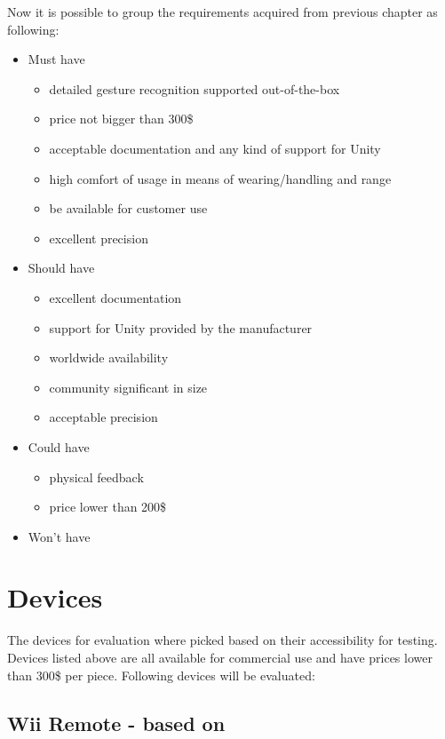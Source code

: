 Now it is possible to group the requirements acquired from previous chapter as following:
\begin{itemize}
\item Must have
\begin{itemize}
\item detailed gesture recognition supported out-of-the-box
\item price not bigger than 300\$
\item acceptable documentation and any kind of support for Unity
\item high comfort of usage in means of wearing/handling and range
\item be available for customer use
\item excellent precision
\end{itemize}
\item Should have
\begin{itemize}
\item excellent documentation
\item support for Unity provided by the manufacturer
\item worldwide availability 
\item community significant in size
\item acceptable precision
\end{itemize}
\item Could have
\begin{itemize}
\item physical feedback
\item price lower than 200\$
\end{itemize}
\item Won't have
\end{itemize}


\section{Devices}
The devices for evaluation where picked based on their accessibility for testing. Devices listed above are all available for commercial use and have prices lower than 300\$ per piece. Following devices will be evaluated:


\subsection[title=Wii Remote]{Wii Remote - based on \cite{wiiu, wii_spec, wii_article}}

